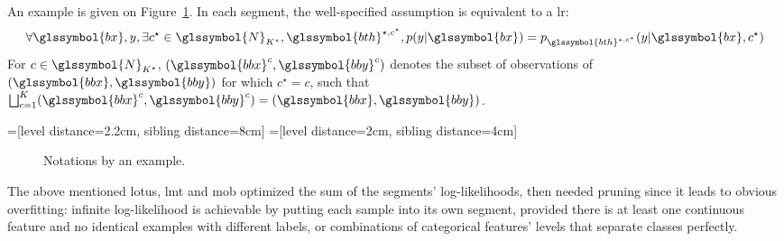 An example is given on Figure~\ref{fig_arbre_ex_notations}.
In each segment, the well-specified assumption is equivalent to a \gls{lr}:
\begin{equation} \label{eq:lr_tree}
\forall \glssymbol{bx}, y, \exists c^\star \in \glssymbol{N}_{K^\star}, \glssymbol{bth}^{\star,c^\star}, p(y | \glssymbol{bx}) = p_{\glssymbol{bth}^{\star,c^\star}}(y | \glssymbol{bx}, c^\star)
\end{equation}
For $c \in \glssymbol{N}_{K^\star}$, $(\glssymbol{bbx}^c, \glssymbol{bby}^c)$ denotes the subset of observations of $(\glssymbol{bbx}, \glssymbol{bby})$ for which $c^\star = c$, such that $ \bigsqcup_{c=1}^{K} (\glssymbol{bbx}^c, \glssymbol{bby}^c) = (\glssymbol{bbx}, \glssymbol{bby})$.

=[level distance=2.2cm, sibling distance=8cm]
=[level distance=2cm, sibling distance=4cm]


\begin{figure}
\caption{Notations by an example.}
\label{fig_arbre_ex_notations}
\end{figure}

The above mentioned \gls{lotus}, \gls{lmt} and \gls{mob} optimized the sum of the segments' log-likelihoods, then needed pruning since it leads to obvious overfitting: infinite log-likelihood is achievable by putting each sample into its own segment, provided there is at least one continuous feature and no identical examples with different labels, or combinations of categorical features' levels that separate classes perfectly.

